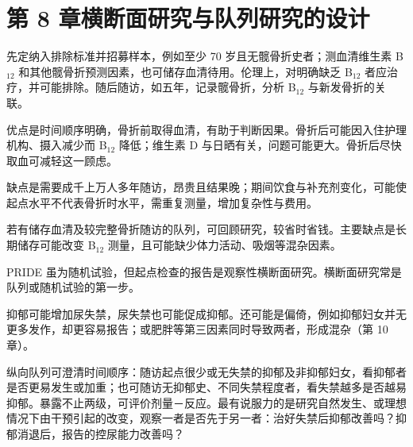 \section{第 8 章\quad 横断面研究与队列研究的设计}
\begin{answerlist}
\item[1a.] 先定纳入排除标准并招募样本，例如至少 70 岁且无髋骨折史者；测血清维生素 B$_{12}$ 和其他髋骨折预测因素，也可储存血清待用。伦理上，对明确缺乏 B$_{12}$ 者应治疗，并可能排除。随后随访，如五年，记录髋骨折，分析 B$_{12}$ 与新发骨折的关联。
\item[1b.] 优点是时间顺序明确，骨折前取得血清，有助于判断因果。骨折后可能因入住护理机构、摄入减少而 B$_{12}$ 降低；维生素 D 与日晒有关，问题可能更大。骨折后尽快取血可减轻这一顾虑。

缺点是需要成千上万人多年随访，昂贵且结果晚；期间饮食与补充剂变化，可能使起点水平不代表骨折时水平，需重复测量，增加复杂性与费用。
\item[1c.] 若有储存血清及较完整骨折随访的队列，可回顾研究，较省时省钱。主要缺点是长期储存可能改变 B$_{12}$ 测量，且可能缺少体力活动、吸烟等混杂因素。
\item[2a.] PRIDE 虽为随机试验，但起点检查的报告是观察性横断面研究。横断面研究常是队列或随机试验的第一步。
\item[2b.] 抑郁可能增加尿失禁，尿失禁也可能促成抑郁。还可能是偏倚，例如抑郁妇女并无更多发作，却更容易报告；或肥胖等第三因素同时导致两者，形成混杂（第 10 章）。

纵向队列可澄清时间顺序：随访起点很少或无失禁的抑郁及非抑郁妇女，看抑郁者是否更易发生或加重；也可随访无抑郁史、不同失禁程度者，看失禁越多是否越易抑郁。暴露不止两级，可评价剂量－反应。最有说服力的是研究自然发生、或理想情况下由干预引起的改变，观察一者是否先于另一者：治好失禁后抑郁改善吗？抑郁消退后，报告的控尿能力改善吗？
\end{answerlist}

